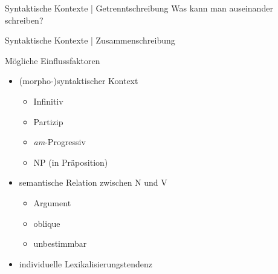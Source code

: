 \begin{frame}
  {Syntaktische Kontexte | Getrenntschreibung}
  Was kann man auseinander schreiben?\\
  \Zeile
  \begin{exe}
  \ex
  \begin{xlist}
    \Zeile
    \Zeile
    \Zeile
    \end{xlist}
  \end{exe}
\end{frame}

\begin{frame}
  {Syntaktische Kontexte | Zusammenschreibung}
  \begin{exe}
  \ex
  \begin{xlist}
    \setcounter{xnumii}{1}
  \end{xlist}
\end{exe}
\end{frame}


\begin{frame}
  {Mögliche Einflussfaktoren}
  \begin{itemize}[<+->]
    \item (morpho-)syntaktischer \alert{Kontext}
      \begin{itemize}[<+->]
        \item Infinitiv
        \item Partizip
        \item \textit{am}-Progressiv
        \item NP (in Präposition)
      \end{itemize}
      \Zeile
    \item \alert{semantische Relation} zwischen N und V
      \begin{itemize}[<+->]
        \item Argument
        \item oblique
        \item unbestimmbar
      \end{itemize}
      \Zeile
    \item individuelle \alert{Lexikalisierungstendenz}\\
  \end{itemize}
\end{frame}

